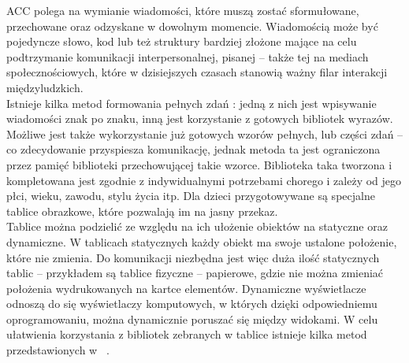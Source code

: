 \documentclass[twoside,a4paper]{book}
\begin{document}
	ACC polega na wymianie wiadomości, które muszą zostać sformułowane, przechowane oraz odzyskane w dowolnym momencie. Wiadomością może być pojedyncze słowo, kod lub też struktury bardziej złożone mające na celu podtrzymanie komunikacji interpersonalnej, pisanej – także tej na mediach społecznościowych, które w dzisiejszych czasach stanowią ważny filar interakcji międzyludzkich.
\\ Istnieje kilka metod formowania pełnych zdań : jedną z nich jest wpisywanie wiadomości znak po znaku, inną jest korzystanie z gotowych bibliotek wyrazów. Możliwe jest także wykorzystanie już gotowych wzorów pełnych, lub części zdań – co zdecydowanie przyspiesza komunikację, jednak metoda ta jest ograniczona przez pamięć biblioteki przechowującej takie wzorce. Biblioteka taka tworzona i kompletowana jest zgodnie z indywidualnymi potrzebami chorego i zależy od jego płci, wieku, zawodu, stylu życia itp. Dla dzieci przygotowywane są specjalne tablice obrazkowe, które pozwalają im na jasny przekaz. \\
Tablice można podzielić ze względu na ich ułożenie obiektów na statyczne oraz dynamiczne. W tablicach statycznych każdy obiekt ma swoje ustalone położenie, które nie zmienia. Do komunikacji niezbędna jest więc duża ilość statycznych tablic – przykładem są tablice fizyczne – papierowe, gdzie nie można zmieniać położenia wydrukowanych na kartce elementów. Dynamiczne wyświetlacze odnoszą do się wyświetlaczy komputowych, w których dzięki odpowiedniemu oprogramowaniu, można dynamicznie poruszać się między widokami.  
W celu ułatwienia korzystania z bibliotek zebranych w tablice istnieje kilka metod przedstawionych w ~\cite{augmentative}.
\end{document}
